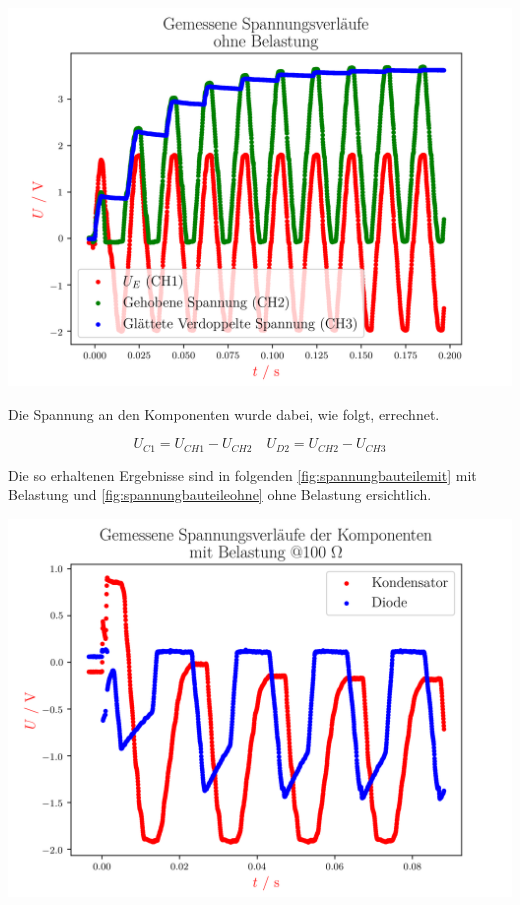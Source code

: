 \documentclass[11pt,ngerman]{scrartcl}
\begin{document}
\begin{center}
	\begin{minipage}[t]{0.8\textwidth}
		\includegraphics[width=\textwidth]{./figures/halbleiter/Versuch4/versuch4spannugenohne.png}
		\label{fig:versuch4spannugenohne}
	\end{minipage}
\end{center}

Die Spannung an den Komponenten wurde dabei, wie folgt, errechnet.

\begin{equation}
	U_{C1} = U_{CH1} - U_{CH2} \quad U_{D2} = U_{CH2} - U_{CH3}
\end{equation}

Die so erhaltenen Ergebnisse sind in folgenden
\autoref{fig:spannungbauteilemit} mit Belastung und
\autoref{fig:spannungbauteileohne} ohne Belastung ersichtlich.

\begin{center}
	\begin{minipage}[t]{0.8\textwidth}
		\includegraphics[width=\textwidth]{./figures/halbleiter/Versuch4/spannungbauteilemit.png}
		\label{fig:spannungbauteilemit}
	\end{minipage}
\end{center}
\end{document}
